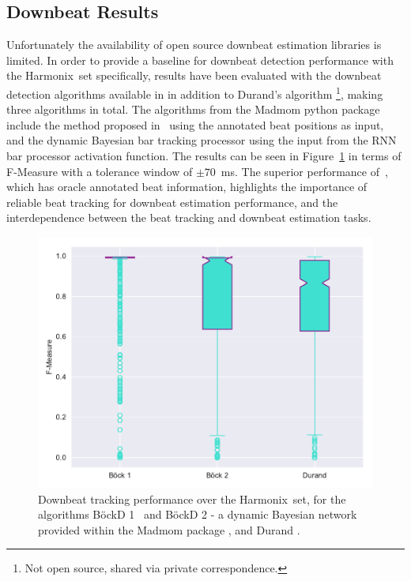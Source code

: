 \documentclass{article}
\newcommand{\setName}{Harmonix}
\begin{document}
\subsection{Downbeat Results}

Unfortunately the availability of open source downbeat estimation libraries is limited. In order to provide a baseline for downbeat detection performance
with the \setName~set specifically, results have been evaluated with the downbeat detection algorithms available in \cite{Bock2016b} in addition to Durand's algorithm \cite{Durand2016}\footnote{Not open source, shared via private correspondence.}, making three algorithms in total.
The algorithms from the Madmom python package \cite{Bock2016b} include the method proposed in~\cite{Bock2016} using the annotated beat positions as input, and the dynamic Bayesian bar tracking processor using the input from the RNN bar processor activation
function. The results can be seen in Figure~\ref{fig:downbeat_results} in terms of F-Measure with a tolerance window of $\pm 70$~ms. The superior performance of~\cite{Bock2016}, which has oracle annotated beat information, highlights the importance
of reliable beat tracking for downbeat estimation performance, and the interdependence between the beat tracking and downbeat estimation tasks.

\begin{figure}
    \centerline{\includegraphics[width=\columnwidth]{figs/2019_04_09_10_27_35_Downbeat_Re_F-Measure.pdf}}
    \caption{Downbeat tracking performance over the \setName~set, for the algorithms B{\"o}ckD 1~\cite{Bock2016} and B{\"o}ckD 2 - a dynamic Bayesian network provided within the Madmom package \cite{Bock2016b}, and Durand \cite{Durand2016}.}
    \label{fig:downbeat_results}
\end{figure}
\end{document}
